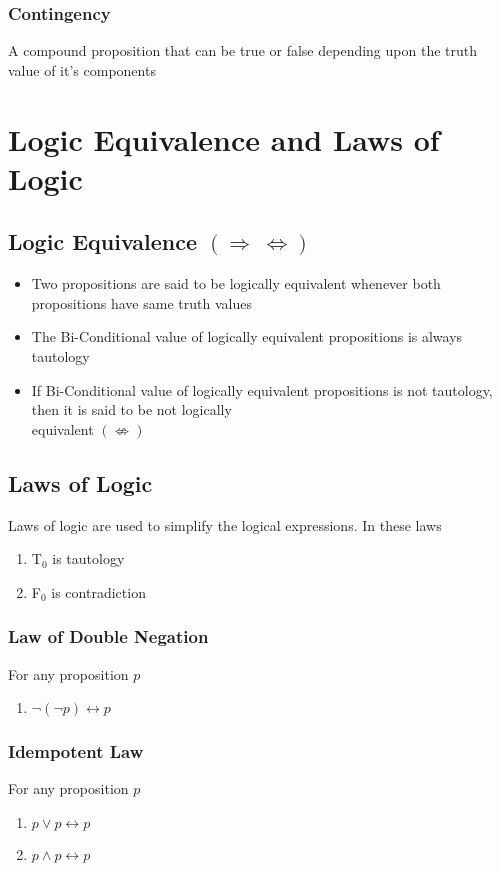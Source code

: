\documentclass{article}
\begin{document}
	\subsubsection{Contingency}
	A compound proposition that can be true or false depending upon the truth value of it's components

	\section{Logic Equivalence and Laws of Logic}
	\subsection{Logic Equivalence $(\Rightarrow ~ \Leftrightarrow)$}
	\begin{itemize}
		\item Two propositions are said to be logically equivalent whenever both propositions have same
			truth values
		\item The Bi-Conditional value of logically equivalent propositions is always tautology
		\item If Bi-Conditional value of logically equivalent propositions is not tautology, then it is
			said to be not logically \\ equivalent $(\not\Leftrightarrow)$
	\end{itemize}

	\subsection{Laws of Logic}
	Laws of logic are used to simplify the logical expressions. In these laws
	\begin{enumerate}[label=\roman*) ]
		\item T$_0$ is tautology
		\item F$_0$ is contradiction
	\end{enumerate}

	\subsubsection{Law of Double Negation}
	For any proposition $p$
	\begin{enumerate}[label=\roman*) ]
		\item $\neg(\neg p)\leftrightarrow p$
	\end{enumerate}

	\subsubsection{Idempotent Law}
	For any proposition $p$
	\begin{enumerate}[label=\roman*) ]
		\item $p\lor p\leftrightarrow p$
		\item $p\land p\leftrightarrow p$
	\end{enumerate}
\end{document}
